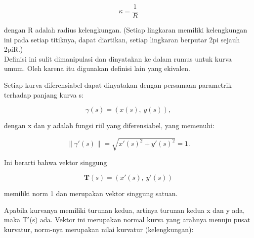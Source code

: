\documentclass[a4paper,10pt]{article}
\begin{document}
\begin{eulernotebook}
\begin{eulercomment}
\begin{eulercomment}
\begin{eulercomment}
\begin{eulercomment}
\begin{eulercomment}
\begin{eulercomment}
\begin{eulercomment}
\begin{eulercomment}
\begin{eulercomment}
\begin{eulercomment}
\begin{eulercomment}
\begin{eulercomment}
\begin{eulercomment}
\begin{eulercomment}
\begin{eulercomment}
\begin{eulercomment}
\begin{eulercomment}
\end{eulercomment}
\begin{eulerformula}
\[
\kappa =\frac {1}{R}
\]
\end{eulerformula}
\begin{eulercomment}
dengan R adalah radius kelengkungan. (Setiap lingkaran memiliki kelengkungan ini pada setiap titiknya, dapat diartikan, setiap
lingkaran berputar 2pi sejauh 2piR.)\\
Definisi ini sulit dimanipulasi dan dinyatakan ke dalam rumus untuk kurva umum. Oleh karena itu digunakan definisi lain yang
ekivalen.

\end{eulercomment}
\begin{eulercomment}
Setiap kurva diferensiabel dapat dinyatakan dengan persamaan parametrik terhadap panjang kurva s:

\end{eulercomment}
\begin{eulerformula}
\[
\gamma(s) = (x(s),\ y(s)),
\]
\end{eulerformula}
\begin{eulercomment}
dengan x dan y adalah fungsi riil yang diferensiabel, yang memenuhi:

\end{eulercomment}
\begin{eulerformula}
\[
\|\gamma'(s)\|=\sqrt{x'(s)^2+y'(s)^2}=1.
\]
\end{eulerformula}
\begin{eulercomment}
Ini berarti bahwa vektor singgung


\end{eulercomment}
\begin{eulerformula}
\[
\mathbf{T}(s)=(x'(s),\ y'(s))
\]
\end{eulerformula}
\begin{eulercomment}
memiliki norm 1 dan merupakan vektor singgung satuan.

Apabila kurvanya memiliki turunan kedua, artinya turunan kedua x dan y ada, maka T'(s) ada. Vektor ini merupakan normal kurva yang
arahnya menuju pusat kurvatur, norm-nya merupakan nilai kurvatur (kelengkungan):


\end{eulercomment}
\end{eulercomment}
\end{eulercomment}
\end{eulercomment}
\end{eulercomment}
\end{eulercomment}
\end{eulercomment}
\end{eulercomment}
\end{eulercomment}
\end{eulercomment}
\end{eulercomment}
\end{eulercomment}
\end{eulercomment}
\end{eulercomment}
\end{eulercomment}
\end{eulercomment}
\end{eulercomment}
\end{eulernotebook}
\end{document}
